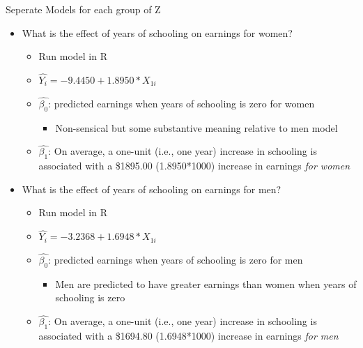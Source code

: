 \documentclass[8pt,ignorenonframetext,dvipsnames]{beamer}
\providecommand{\tightlist}{%
  \setlength{\itemsep}{0pt}\setlength{\parskip}{0pt}}
\let\olditem\item
\renewcommand{\item}{%
  \olditem\vspace{4pt}
}
\begin{document}
\begin{frame}{Seperate Models for each group of Z}
\protect\hypertarget{seperate-models-for-each-group-of-z}{}

\begin{itemize}
\tightlist
\item
  What is the effect of years of schooling on earnings for women?

  \begin{itemize}
  \tightlist
  \item
    Run model in R
  \item
    \(\hat{Y_i} = -9.4450 + 1.8950*X_{1i}\)
  \item
    \(\hat{\beta_0}\): predicted earnings when years of schooling is
    zero for women

    \begin{itemize}
    \tightlist
    \item
      Non-sensical but some substantive meaning relative to men model
    \end{itemize}
  \item
    \(\hat{\beta_1}\): On average, a one-unit (i.e., one year) increase
    in schooling is associated with a \$1895.00 (1.8950*1000) increase
    in earnings \emph{for women}
  \end{itemize}
\item
  What is the effect of years of schooling on earnings for men?

  \begin{itemize}
  \tightlist
  \item
    Run model in R
  \item
    \(\hat{Y_i} = -3.2368 + 1.6948*X_{1i}\)
  \item
    \(\hat{\beta_0}\): predicted earnings when years of schooling is
    zero for men

    \begin{itemize}
    \tightlist
    \item
      Men are predicted to have greater earnings than women when years
      of schooling is zero
    \end{itemize}
  \item
    \(\hat{\beta_1}\): On average, a one-unit (i.e., one year) increase
    in schooling is associated with a \$1694.80 (1.6948*1000) increase
    in earnings \emph{for men}
  \end{itemize}
\end{itemize}

\end{frame}
\end{document}
